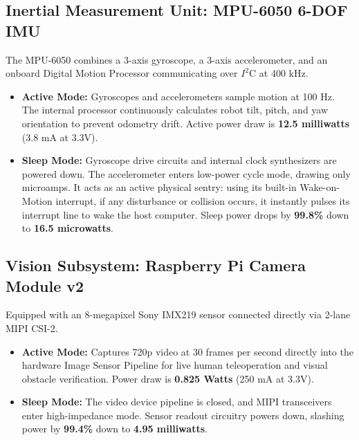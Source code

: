 \documentclass[11pt,a4paper]{article}
\begin{document}
\subsection{Inertial Measurement Unit: MPU-6050 6-DOF IMU}
The MPU-6050 combines a 3-axis gyroscope, a 3-axis accelerometer, and an onboard Digital Motion Processor communicating over $I^2$C at 400 kHz.
\begin{itemize}
    \item \textbf{Active Mode:} Gyroscopes and accelerometers sample motion at 100 Hz. The internal processor continuously calculates robot tilt, pitch, and yaw orientation to prevent odometry drift. Active power draw is \textbf{12.5 milliwatts} (3.8 mA at 3.3V).
    \item \textbf{Sleep Mode:} Gyroscope drive circuits and internal clock synthesizers are powered down. The accelerometer enters low-power cycle mode, drawing only microamps. It acts as an active physical sentry: using its built-in Wake-on-Motion interrupt, if any disturbance or collision occurs, it instantly pulses its interrupt line to wake the host computer. Sleep power drops by \textbf{99.8\%} down to \textbf{16.5 microwatts}.
\end{itemize}

\subsection{Vision Subsystem: Raspberry Pi Camera Module v2}
Equipped with an 8-megapixel Sony IMX219 sensor connected directly via 2-lane MIPI CSI-2.
\begin{itemize}
    \item \textbf{Active Mode:} Captures 720p video at 30 frames per second directly into the hardware Image Sensor Pipeline for live human teleoperation and visual obstacle verification. Power draw is \textbf{0.825 Watts} (250 mA at 3.3V).
    \item \textbf{Sleep Mode:} The video device pipeline is closed, and MIPI transceivers enter high-impedance mode. Sensor readout circuitry powers down, slashing power by \textbf{99.4\%} down to \textbf{4.95 milliwatts}.
\end{itemize}
\end{document}
